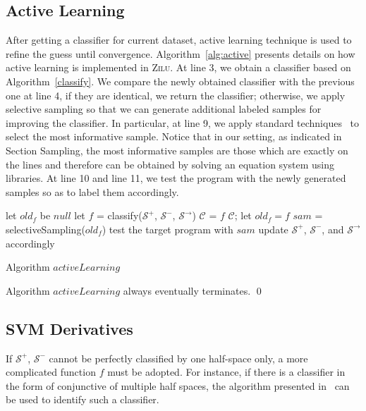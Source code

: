 \subsection{Active Learning} 
After getting a classifier for current dataset, active learning technique is used to refine the guess until convergence. 
Algorithm~\ref{alg:active} presents details on how active learning is implemented in \textsc{Zilu}. 
At line 3, we obtain a classifier based on Algorithm~\ref{classify}. 
We compare the newly obtained classifier with the previous one at line 4, if they are identical, we return the classifier; 
otherwise, we apply selective sampling so that we can generate additional labeled samples for improving the classifier. 
In particular, at line 9, we apply standard techniques~\cite{DBLP:conf/icml/SchohnC00} to select the most informative sample. 
Notice that in our setting, as indicated in Section Sampling, the most informative samples are those which are exactly on the lines 
and therefore can be obtained by solving an equation system using libraries. 
At line 10 and line 11, we test the program with the newly generated samples so as to label them accordingly.
\begin{algorithm}[t]
\SetAlgoVlined
\Indm
{}
\Indp
let $old_f$ be $null$\;
 {
    let $f$ = classify($\mathcal{S}^+$, $\mathcal{S}^-$, $\mathcal{S}^\rightarrow$)\;
     {
         {
            $\mathcal{C}$ = $f$\;
            \Return $\mathcal{C}$;
        }
        let $old_f = f$\;
    }
    $sam$ = selectiveSampling($old_f$)\;
    test the target program with $sam$\;
    update $\mathcal{S}^+$, $\mathcal{S}^-$, and $\mathcal{S}^\rightarrow$ accordingly\;
}
\caption{Algorithm $activeLearning$}
\label{alg:active}
\end{algorithm}



\begin{proposition}
Algorithm $activeLearning$ always eventually terminates. \hfill \qed
\end{proposition}


\subsection{SVM Derivatives}
If $\mathcal{S}^+$, $\mathcal{S}^-$ cannot be perfectly classified by one half-space only, 
a more complicated function $f$ must be adopted. 
For instance, if there is a classifier in the form of conjunctive of multiple half spaces, 
the algorithm presented in~\cite{Sharma2012} can be used to identify such a classifier.

